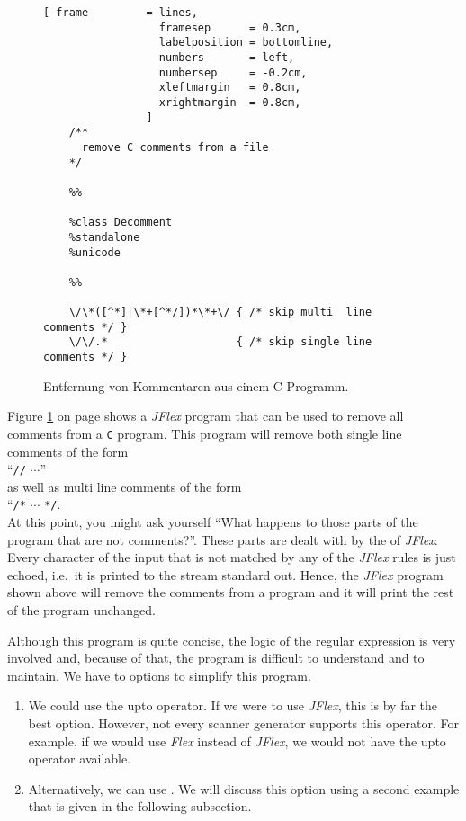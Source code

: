 \begin{figure}[!h]
\centering
\begin{Verbatim}[ frame         = lines, 
                  framesep      = 0.3cm, 
                  labelposition = bottomline,
                  numbers       = left,
                  numbersep     = -0.2cm,
                  xleftmargin   = 0.8cm,
                  xrightmargin  = 0.8cm,
                ]
    /**
      remove C comments from a file 
    */
    
    %%
    
    %class Decomment
    %standalone
    %unicode
    
    %%
    
    \/\*([^*]|\*+[^*/])*\*+\/ { /* skip multi  line comments */ }
    \/\/.*                    { /* skip single line comments */ }
\end{Verbatim}
\vspace*{-0.3cm}
\caption{Entfernung von Kommentaren aus einem C-Programm.}
\label{fig:decomment.jflex}
\end{figure}

\noindent
Figure \ref{fig:decomment.jflex} on page \pageref{fig:decomment.jflex} shows a \textsl{JFlex}
program that can be used to remove all comments from a \texttt{C} program.  This program will remove
both single line comments of the form
\\[0.2cm]
\hspace*{1.3cm}
 ``\texttt{//} $\cdots$''
\\[0.2cm]
as well as multi line comments of the form
\\[0.2cm]
\hspace*{1.3cm}
``\texttt{/*} $\cdots$ \texttt{*/}. 
\\[0.2cm]
At this point, you might ask yourself ``What happens to those parts of the program that are not comments?''.
These parts are dealt with by the   of \textsl{JFlex}:  Every character of the
input that is not matched by any of the \textsl{JFlex} rules is just echoed, i.e.~it is printed to
the stream standard out.   Hence, the \textsl{JFlex} program shown above will remove the comments from a
program and it will print the rest of the program unchanged.

Although this program is quite concise, the logic of the regular expression is very involved and,
because of that, the program is difficult to understand and to maintain. 
We have to options to simplify this program.
\begin{enumerate}
\item We could use the upto operator.  If we were to use \textsl{JFlex}, this is by far the best
      option.  However, not every scanner generator supports this operator.  For example, if we
      would use \textsl{Flex} instead of \textsl{JFlex}, we would not have the upto operator available.
\item Alternatively, we can use .
      We will discuss this option using a second example that is given in the following subsection.
\end{enumerate}

